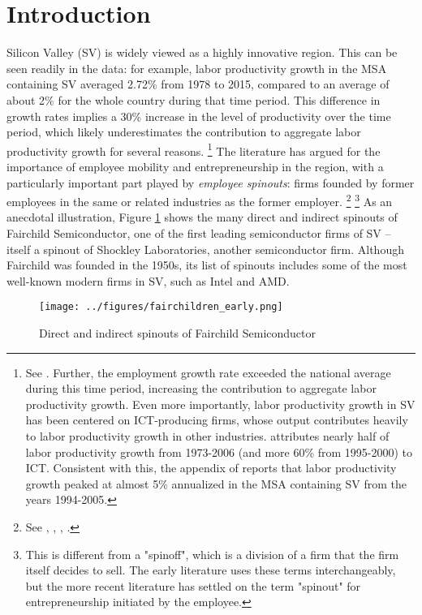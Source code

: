 \documentclass[12pt,english]{article}
\theoremstyle{remark}
\begin{document}
\section{Introduction}


Silicon Valley (SV) is widely viewed as a highly innovative region. This can be seen readily in the data: for example, labor productivity growth in the MSA containing SV averaged 2.72\% from 1978 to 2015, compared to an average of about 2\% for the whole country during that time period. This difference in growth rates implies a 30\% increase in the level of productivity over the time period, which likely underestimates the contribution to aggregate labor productivity growth for several reasons. \footnote{See \cite{parilla_understanding_2017}. Further, the employment growth rate exceeded the national average during this time period, increasing the contribution to aggregate labor productivity growth. Even more importantly, labor productivity growth in SV has been centered on ICT-producing firms, whose output contributes heavily to labor productivity growth in other industries. \cite{jorgenson_retrospective_2008} attributes nearly half of labor productivity growth from 1973-2006 (and more 60\% from 1995-2000) to ICT. Consistent with this, the appendix of  \cite{parilla_understanding_2017} reports that labor productivity growth peaked at almost 5\% annualized in the MSA containing SV from the years 1994-2005.} The literature has argued for the importance of employee mobility and entrepreneurship in the region, with a particularly important part played by \textit{employee spinouts}: firms founded by former employees in the same or related industries as the former employer. \footnote{See \cite{saxenian_regional_1994}, \cite{gilson_legal_1999}, \cite{fallick_job-hopping_2006}, \cite{franco_covenants_2008}.} \footnote{This is different from a "spinoff", which is a division of a firm that the firm itself decides to sell. The early literature uses these terms interchangeably, but the more recent literature has settled on the term "spinout" for entrepreneurship initiated by the employee.} As an anecdotal illustration, Figure \ref{fairchild_spinouts} shows the many direct and indirect spinouts of Fairchild Semiconductor, one of the first leading semiconductor firms of SV -- itself a spinout of Shockley Laboratories, another semiconductor firm. Although Fairchild was founded in the 1950s, its list of spinouts includes some of the most well-known modern firms in SV, such as Intel and AMD. 

\begin{figure}	
	\center
	\texttt{[image: ../figures/fairchildren\_early.png]}
	\caption{Direct and indirect spinouts of Fairchild Semiconductor}
	\label{fairchild_spinouts}
\end{figure}
\end{document}
